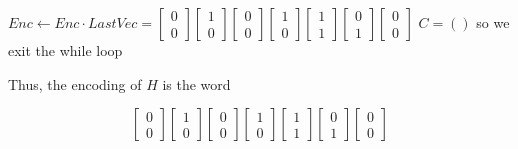 \begin{example}
\begin{algorithmic}
	\State \hspace{2em} $Enc\gets Enc\cdot LastVec=\begin{bmatrix} 0 \\ 0 \end{bmatrix}\!\!
	\begin{bmatrix}1 \\ 0 \end{bmatrix}\!\!
	\begin{bmatrix} 0 \\ 0 \end{bmatrix}\!\!
	\begin{bmatrix} 1 \\ 0 \end{bmatrix}\!\!
	\begin{bmatrix} 1 \\ 1 \end{bmatrix}\!\!
	\begin{bmatrix} 0 \\ 1 \end{bmatrix}\!\!
	\begin{bmatrix} 0 \\ 0 \end{bmatrix}$
\State \hrulefill
\State  $C = ()$ so we exit the while loop
\end{algorithmic}

Thus, the encoding of $H$ is the word

\[
\begin{bmatrix} 0 \\ 0 \end{bmatrix}\!\!
	\begin{bmatrix}1 \\ 0 \end{bmatrix}\!\!
	\begin{bmatrix} 0 \\ 0 \end{bmatrix}\!\!
	\begin{bmatrix} 1 \\ 0 \end{bmatrix}\!\!
	\begin{bmatrix} 1 \\ 1 \end{bmatrix}\!\!
	\begin{bmatrix} 0 \\ 1 \end{bmatrix}\!\!
	\begin{bmatrix} 0 \\ 0 \end{bmatrix}
\]

\end{example}


